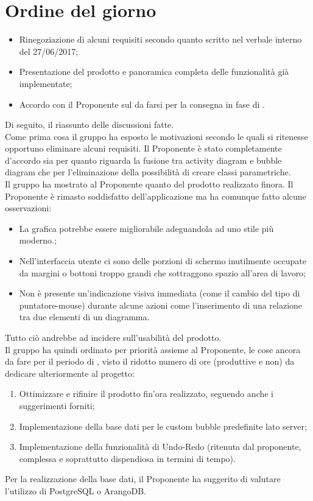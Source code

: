 \documentclass[../AnalisiDeiRequisiti.tex]{subfiles}
\begin{document}
	\section*{Ordine del giorno}
		\begin{itemize}
			\item Rinegoziazione di alcuni requisiti secondo quanto scritto nel verbale interno del 27/06/2017;
			\item Presentazione del prodotto e panoramica completa delle funzionalità già implementate;
			\item Accordo con il Proponente sul da farsi per la consegna in fase di \revisionediaccettazione.
		\end{itemize}
		Di seguito, il riassunto delle discussioni fatte.\\
		
		Come prima cosa il gruppo ha esposto le motivazioni secondo le quali si ritenesse opportuno eliminare
		alcuni requisiti. Il Proponente è stato completamente d'accordo sia per quanto riguarda la fusione tra
		activity diagram e bubble diagram che per l'eliminazione della possibilità di creare classi parametriche.\\
		Il gruppo ha mostrato al Proponente quanto del prodotto realizzato finora. Il Proponente è rimasto
		soddisfatto dell'applicazione ma ha comunque fatto alcune osservazioni:
		\begin{itemize}
			\item La grafica potrebbe essere migliorabile adeguandola ad uno stile più moderno.;
			\item Nell'interfaccia utente ci sono delle porzioni di schermo inutilmente occupate da margini o
			bottoni troppo grandi che sottraggono spazio all'area di lavoro;
			\item Non è presente un'indicazione visiva immediata (come il cambio del tipo di puntatore-mouse)
			durante alcune azioni come l'inserimento di una relazione tra due elementi di un diagramma.
		\end{itemize}
		Tutto ciò andrebbe ad incidere sull'usabilità del prodotto.\\
		Il gruppo ha quindi ordinato per priorità assieme al Proponente, le cose ancora da fare per il periodo di
		\revisionediaccettazione, visto il ridotto numero di ore (produttive e non) da dedicare ulteriormente al
		progetto:
		\begin{enumerate}
			\item Ottimizzare e rifinire il prodotto fin'ora realizzato, seguendo anche i suggerimenti forniti;
			\item Implementazione della base dati per le custom bubble predefinite lato server;
			\item Implementazione della funzionalità di Undo-Redo (ritenuta dal proponente, complessa e soprattutto
			dispendiosa in termini di tempo).
		\end{enumerate}
		Per la realizzazione della base dati, il Proponente ha suggerito di valutare l'utilizzo di PostgreSQL o
		ArangoDB.\\
		
\end{document}
